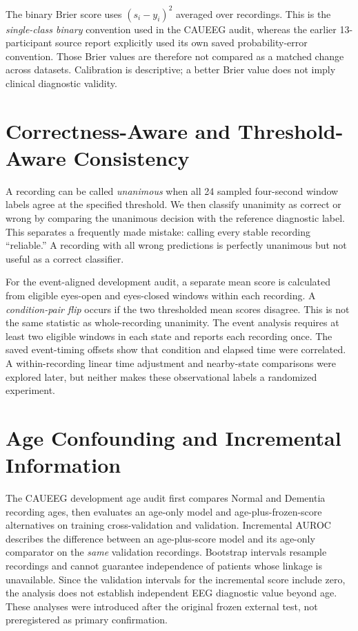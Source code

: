 The binary Brier score uses $(s_i-y_i)^2$ averaged over recordings. This is the \emph{single-class binary} convention used in the CAUEEG audit, whereas the earlier 13-participant source report explicitly used its own saved probability-error convention. Those Brier values are therefore not compared as a matched change across datasets. Calibration is descriptive; a better Brier value does not imply clinical diagnostic validity.

\section{Correctness-Aware and Threshold-Aware Consistency}
A recording can be called \emph{unanimous} when all 24 sampled four-second window labels agree at the specified threshold. We then classify unanimity as correct or wrong by comparing the unanimous decision with the reference diagnostic label. This separates a frequently made mistake: calling every stable recording ``reliable.'' A recording with all wrong predictions is perfectly unanimous but not useful as a correct classifier.

For the event-aligned development audit, a separate mean score is calculated from eligible eyes-open and eyes-closed windows within each recording. A \emph{condition-pair flip} occurs if the two thresholded mean scores disagree. This is not the same statistic as whole-recording unanimity. The event analysis requires at least two eligible windows in each state and reports each recording once. The saved event-timing offsets show that condition and elapsed time were correlated. A within-recording linear time adjustment and nearby-state comparisons were explored later, but neither makes these observational labels a randomized experiment.

\section{Age Confounding and Incremental Information}
The CAUEEG development age audit first compares Normal and Dementia recording ages, then evaluates an age-only model and age-plus-frozen-score alternatives on training cross-validation and validation. Incremental AUROC describes the difference between an age-plus-score model and its age-only comparator on the \emph{same} validation recordings. Bootstrap intervals resample recordings and cannot guarantee independence of patients whose linkage is unavailable. Since the validation intervals for the incremental score include zero, the analysis does not establish independent EEG diagnostic value beyond age. These analyses were introduced after the original frozen external test, not preregistered as primary confirmation.

